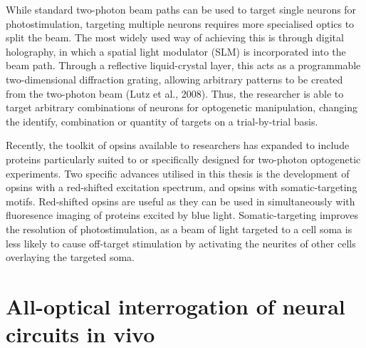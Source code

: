 While standard two-photon beam paths can be used to target single neurons for photostimulation, targeting multiple neurons requires more specialised optics to split the beam. The most widely used way of achieving this is through digital holography, in which a spatial light modulator (SLM) 	is incorporated into the beam path. Through a reflective liquid-crystal layer, this acts as a programmable two-dimensional diffraction grating, allowing arbitrary patterns to be created from the two-photon beam (Lutz et al., 2008). Thus, the researcher is able to target arbitrary combinations of neurons for optogenetic manipulation, changing the identify, combination or quantity of targets on a trial-by-trial basis. 

Recently, the toolkit of opsins available to researchers has expanded to include proteins particularly suited to \cite{yizhar_neocortical_2011} or specifically designed for \cite{chettih_single-neuron_2019, mardinly_precise_2018, marshel_cortical_2019} two-photon optogenetic experiments. Two specific advances utilised in this thesis is the development of opsins with a red-shifted excitation spectrum, and opsins with somatic-targeting motifs. Red-shifted opsins are useful as they can be used in simultaneously with fluoresence imaging of proteins excited by blue light. Somatic-targeting improves the resolution of photostimulation, as a beam of light targeted to a cell soma is less likely to cause off-target stimulation by activating the neurites of other cells overlaying the targeted soma.

\section{All-optical interrogation of neural circuits in vivo}
 

